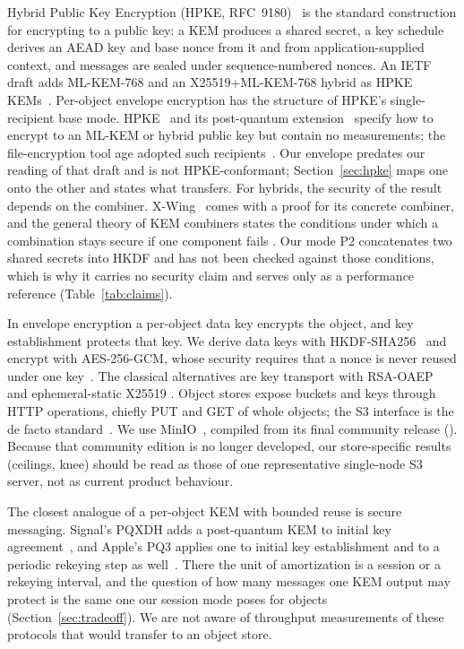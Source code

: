 \documentclass[conference]{IEEEtran}
\begin{document}
Hybrid Public Key Encryption (HPKE, RFC~9180)~\cite{rfc9180} is the standard construction for
encrypting to a public key: a KEM produces a shared secret, a key schedule derives an AEAD key
and base nonce from it and from application-supplied context, and messages are sealed under
sequence-numbered nonces. An IETF draft adds ML-KEM-768 and an X25519+ML-KEM-768 hybrid as HPKE
KEMs~\cite{hpkepq}. Per-object envelope encryption has the structure of HPKE's single-recipient
base mode.
HPKE~\cite{rfc9180} and its post-quantum extension~\cite{hpkepq} specify how to encrypt to an
ML-KEM or hybrid public key but contain no measurements; the file-encryption tool age adopted
such recipients~\cite{age2025}. Our envelope predates our reading of that draft and is not
HPKE-conformant; Section~\ref{sec:hpke} maps one onto the other and states what transfers. For
hybrids, the security of the result depends on the combiner. X-Wing~\cite{barbosa2024,xwing}
comes with a proof for its concrete combiner, and the general theory of KEM combiners states the
conditions under which a combination stays secure if one component fails
\cite{giacon2018,bindel2019}.
Our mode P2 concatenates two shared secrets into HKDF and has not been checked against those
conditions, which is why it carries no security claim and serves only as a performance
reference (Table~\ref{tab:claims}).

In envelope encryption a per-object data key encrypts the object, and key establishment protects
that key. We derive data keys with HKDF-SHA256~\cite{rfc5869} and encrypt with AES-256-GCM, whose
security requires that a nonce is never reused under one key~\cite{sp80038d}. The classical
alternatives are key transport with RSA-OAEP~\cite{rfc8017} and ephemeral-static X25519
\cite{rfc7748}. Object stores expose buckets and keys through HTTP operations, chiefly PUT and
GET of whole objects; the S3 interface is the de facto standard~\cite{gadban2021}. We use
MinIO~\cite{minio}, compiled from its final community release (\MinioRelease). Because that
community edition is no longer developed, our store-specific results (ceilings, knee) should be
read as those of one representative single-node S3 server, not as current product behaviour.

The closest analogue of a per-object KEM with bounded reuse is secure messaging. Signal's PQXDH
adds a post-quantum KEM to initial key agreement~\cite{pqxdh2023}, and Apple's PQ3 applies one to
initial key establishment and to a periodic rekeying step as well~\cite{pq32024}. There the unit
of amortization is a session or a rekeying interval, and the question of how many messages one
KEM output may protect is the same one our session mode poses for objects
(Section~\ref{sec:tradeoff}). We are not aware of throughput measurements of these protocols
that would transfer to an object store.
\end{document}
